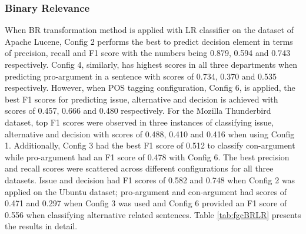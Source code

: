 \documentclass[a4paper,12pt,twoside]{report}
\begin{document}
\subsubsection{Binary Relevance}
When \acs{BR} transformation method is applied with \acs{LR} classifier on the dataset of Apache Lucene, Config 2 performs the best to predict decision element in terms of precision, recall and F1 score with the numbers being 0.879, 0.594 and 0.743 respectively. Config 4, similarly, has highest scores in all three departments when predicting pro-argument in a sentence with scores of 0.734, 0.370 and 0.535 respectively. However, when \acs{POS} tagging configuration, Config 6, is applied, the best F1 scores for predicting issue, alternative and decision is achieved with scores of 0.457, 0.666 and 0.480 respectively. For the Mozilla Thunderbird dataset, top F1 scores were observed in three instances of classifying issue, alternative and decision with scores of 0.488, 0.410 and 0.416 when using Config 1. Additionally, Config 3 had the best F1 score of 0.512 to classify con-argument while pro-argument had an F1 score of 0.478 with Config 6. The best precision and recall scores were scattered across different configurations for all three datasets. Issue and decision had F1 scores of 0.582 and 0.748 when Config 2 was applied on the Ubuntu dataset; pro-argument and con-argument had scores of 0.471 and 0.297 when Config 3 was used and Config 6 provided an F1 score of 0.556 when classifying alternative related sentences. Table \ref{tab:fgcBRLR} presents the results in detail.
\end{document}
